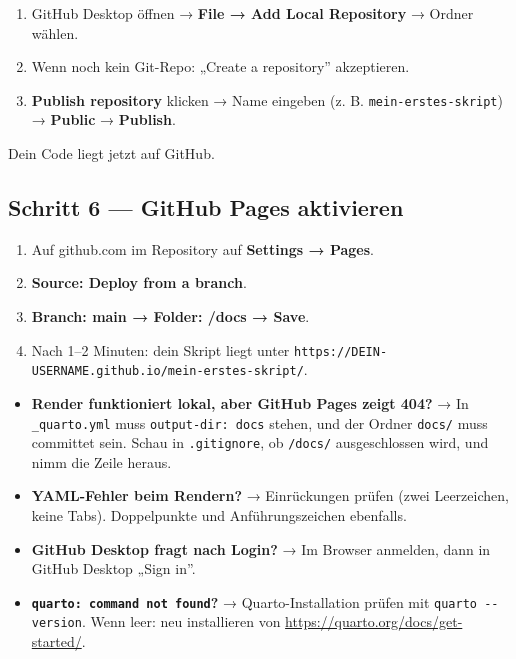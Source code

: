 \documentclass[
  ngerman,
  a4paper,
  DIV=11]{scrreprt}
\providecommand{\tightlist}{%
  \setlength{\itemsep}{0pt}\setlength{\parskip}{0pt}}
\begin{document}
\begin{enumerate}
\def\labelenumi{\arabic{enumi}.}
\tightlist
\item
  GitHub Desktop öffnen → \textbf{File → Add Local Repository} → Ordner
  wählen.
\item
  Wenn noch kein Git-Repo: „Create a repository'' akzeptieren.
\item
  \textbf{Publish repository} klicken → Name eingeben (z. B.
  \texttt{mein-erstes-skript}) → \textbf{Public} → \textbf{Publish}.
\end{enumerate}

Dein Code liegt jetzt auf GitHub.

\subsection{Schritt 6 --- GitHub Pages
aktivieren}\label{schritt-6-github-pages-aktivieren}

\begin{enumerate}
\def\labelenumi{\arabic{enumi}.}
\tightlist
\item
  Auf github.com im Repository auf \textbf{Settings → Pages}.
\item
  \textbf{Source: Deploy from a branch}.
\item
  \textbf{Branch: main → Folder: /docs → Save}.
\item
  Nach 1--2 Minuten: dein Skript liegt unter
  \texttt{https://DEIN-USERNAME.github.io/mein-erstes-skript/}.
\end{enumerate}

\begin{tcolorbox}[enhanced jigsaw, opacitybacktitle=0.6, leftrule=.75mm, title=\textcolor{quarto-callout-warning-color}{\faExclamationTriangle}\hspace{0.5em}{Was, wenn \ldots{}}, colframe=quarto-callout-warning-color-frame, arc=.35mm, toprule=.15mm, colbacktitle=quarto-callout-warning-color!10!white, bottomrule=.15mm, colback=white, rightrule=.15mm, breakable, toptitle=1mm, bottomtitle=1mm, opacityback=0, titlerule=0mm, coltitle=black, left=2mm]

\begin{itemize}
\tightlist
\item
  \textbf{Render funktioniert lokal, aber GitHub Pages zeigt 404?} → In
  \texttt{\_quarto.yml} muss \texttt{output-dir:\ docs} stehen, und der
  Ordner \texttt{docs/} muss committet sein. Schau in
  \texttt{.gitignore}, ob \texttt{/docs/} ausgeschlossen wird, und nimm
  die Zeile heraus.
\item
  \textbf{YAML-Fehler beim Rendern?} → Einrückungen prüfen (zwei
  Leerzeichen, keine Tabs). Doppelpunkte und Anführungszeichen
  ebenfalls.
\item
  \textbf{GitHub Desktop fragt nach Login?} → Im Browser anmelden, dann
  in GitHub Desktop „Sign in''.
\item
  \textbf{\texttt{quarto:\ command\ not\ found}?} → Quarto-Installation
  prüfen mit \texttt{quarto\ -\/-version}. Wenn leer: neu installieren
  von \url{https://quarto.org/docs/get-started/}.
\end{itemize}

\end{tcolorbox}
\end{document}
